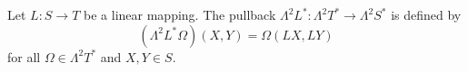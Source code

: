 Let $L: S \to T$ be a linear mapping. The pullback $\Lambda^2 L^*: \Lambda^2 T^* \to \Lambda^2 S^*$ is defined by
$$(\Lambda^2 L^* \Omega)(X, Y) = \Omega(LX, LY)$$
for all $\Omega \in \Lambda^2 T^*$ and $X, Y \in S$.

